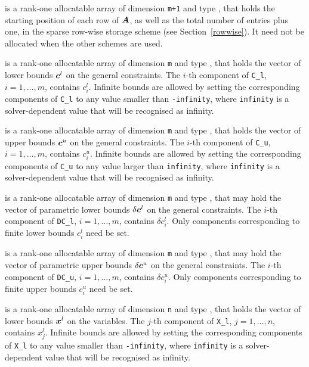 \documentclass{galahad}
\begin{document}
\begin{description}
\begin{description}
 is a rank-one allocatable array of dimension {\tt m+1} and type 
\integer, that holds the 
starting position of each row of ${\bm{A}}$, as well
as the total number of entries plus one, in the sparse row-wise storage
scheme (see Section~\ref{rowwise}). It need not be allocated when the
other schemes are used.

\end{description}

 is a rank-one allocatable array of dimension {\tt m} and type 
\realdp, that holds the vector of lower bounds ${\bm{c}}^{l}$ 
on the general constraints. The $i$-th component of 
{\tt C\_l}, $i = 1, \ldots , m$, contains $c_{i}^{l}$.
Infinite bounds are allowed by setting the corresponding 
components of {\tt C\_l} to any value smaller than {\tt -infinity}, 
where {\tt infinity} is a  solver-dependent value that will be recognised as
infinity.

 is a rank-one allocatable array of dimension {\tt m} and type 
\realdp, that holds the vector of upper bounds ${\bm{c}}^{u}$ 
on the general constraints. The $i$-th component of 
{\tt C\_u}, $i = 1,  \ldots ,  m$, contains $c_{i}^{u}$.
Infinite bounds are allowed by setting the corresponding 
components of {\tt C\_u} to any value larger than {\tt infinity}, 
where {\tt infinity} is a  solver-dependent value that will be recognised as
infinity.

 is a rank-one allocatable array of dimension {\tt m} and type 
\realdp, that may hold the vector of parametric lower bounds 
$\delta {\bm{c}}^{l}$ on the general constraints. The $i$-th component of 
{\tt DC\_l}, $i = 1, \ldots , m$, contains $\delta c_{i}^{l}$.
Only components corresponding to finite lower bounds $c_{i}^{l}$
need be set.

 is a rank-one allocatable array of dimension {\tt m} and type 
\realdp, that may hold the vector of parametric upper bounds 
$\delta {\bm{c}}^{u}$  on the general constraints. The $i$-th component of 
{\tt DC\_u}, $i = 1,  \ldots ,  m$, contains $\delta c_{i}^{u}$.
Only components corresponding to finite upper bounds $c_{i}^{u}$
need be set.

 is a rank-one allocatable array of dimension {\tt n} and type 
\realdp, that holds
the vector of lower bounds ${\bm{x}}^{l}$ on the variables.
The $j$-th component of {\tt X\_l}, $j = 1, \ldots , n$, 
contains $x_{j}^{l}$.
Infinite bounds are allowed by setting the corresponding 
components of {\tt X\_l} to any value smaller than {\tt -infinity}, 
where {\tt infinity} is a  solver-dependent value that will be recognised as
infinity.


\end{description}
\end{document}
